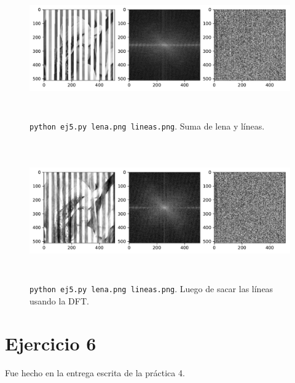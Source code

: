 \documentclass[11pt, spanish]{article}
\begin{document}
\begin{figure}[H]
\centering
  \includegraphics[height=6cm]{informe-imgs/ej5-suma.pdf}
  \caption{\texttt{python ej5.py lena.png lineas.png}. Suma de lena y líneas.}
\end{figure}

\begin{figure}[H]
\centering
  \includegraphics[height=6cm]{informe-imgs/ej5-res.pdf}
  \caption{\texttt{python ej5.py lena.png lineas.png}. Luego de sacar las líneas usando la DFT.}
\end{figure}



\newpage
\section{Ejercicio 6}
Fue hecho en la entrega escrita de la práctica 4.
\end{document}
